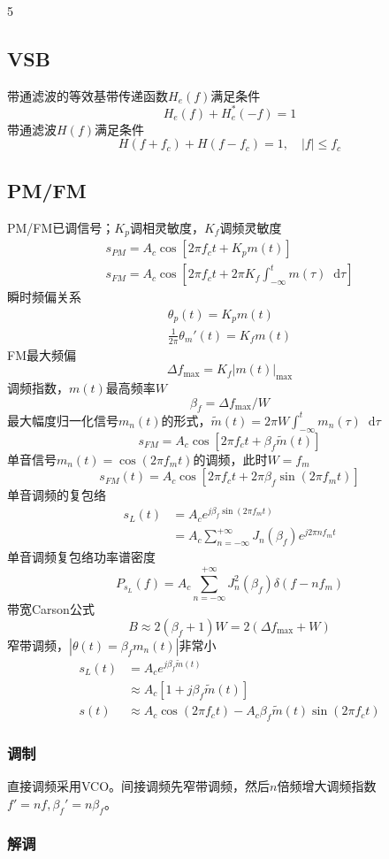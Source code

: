 \documentclass[8pt, a4paper]{extarticle}
\newcommand*{\dif}{\mathop{}\!\mathrm{d}}
\begin{document}
\begin{multicols}{5}
\subsection{VSB}
带通滤波的等效基带传递函数\(H_e(f)\)满足条件
\[
H_e(f)+H_e^*(-f)=1
\]
带通滤波\(H(f)\)满足条件
\[
H(f+f_c)+H(f-f_c)=1,\quad |f|\leq f_c
\]
\subsection{PM/FM}
PM/FM已调信号；\(K_p\)调相灵敏度，\(K_f\)调频灵敏度
\begin{gather*}
s_{PM} =A_c\cos\left[2\pi f_c t + K_p m(t)\right]\\
s_{FM} =A_c\cos\left[2\pi f_c t + 2\pi K_f \int_{-\infty}^{t}m(\tau)\dif \tau\right]
\end{gather*}
瞬时频偏关系
\begin{gather*}
\theta_p(t) = K_p m(t)\\
\frac{1}{2\pi}\theta_m'(t)=K_f m(t) 
\end{gather*}
FM最大频偏
\[
\Delta f_{\max} =K_f|m(t)|_{\max}
\]
调频指数，\(m(t)\)最高频率\(W\)
\[
\beta_f = \Delta f_{\max}/W
\]
最大幅度归一化信号\(m_n(t)\)的形式，\(\tilde{m}(t)=2\pi W\int_{-\infty}^{t}m_n(\tau)\dif \tau\)
\[
s_{FM}=A_c\cos\left[2\pi f_c t + \beta_f \tilde{m}(t)\right]
\]
单音信号\(m_n(t)=\cos(2\pi f_m t)\)的调频，此时\(W=f_m\)
\[
s_{FM}(t)=A_c\cos\left[2\pi f_c t + 2\pi \beta_f \sin(2\pi f_m t)\right]
\]
单音调频的复包络
\begin{align*}
s_L(t)&=A_c e^{j\beta_f\sin(2\pi f_m t)}\\
&=A_c\sum_{n=-\infty}^{+\infty}J_n(\beta_f)e^{j2\pi n f_m t}
\end{align*}
单音调频复包络功率谱密度
\[
P_{s_L}(f)=A_c\sum_{n=-\infty}^{+\infty}J_n^2(\beta_f)\delta(f-nf_m)
\]
带宽Carson公式
\[
B\approx 2(\beta_f+1)W=2(\Delta f_{\max} +W)
\]
窄带调频，\(|\theta(t)=\beta_f m_n(t)|\)非常小
\begin{align*}
s_L(t) &=A_c e^{j\beta_f \tilde{m}(t)}\\
&\approx A_c[1+j\beta_f \tilde{m}(t)]\\
s(t) &\approx A_c\cos(2\pi f_c t)-A_c\beta_f \tilde{m}(t)\sin(2\pi f_c t)
\end{align*}
\subsubsection{调制}
直接调频采用VCO。间接调频先窄带调频，然后\(n\)倍频增大调频指数\(f'=nf,\beta_f'=n\beta_f\)。
\subsubsection{解调}

\end{multicols}
\end{document}
